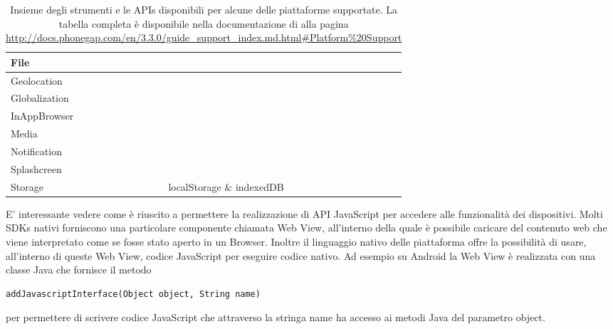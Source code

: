 {\begin{table}
\begin{tabularx}{\textwidth}{|l*{7}{|s}|}
                        \tabularnewline
                        \hline
                        File & \sprt{} & \sprt{} & \sprt{} & \sprt{} & \notsprt{}
                        \tabularnewline
                        \hline
                        Geolocation & \sprt{} & \sprt{} & \sprt{} & \sprt{} & \sprt{}
                        \tabularnewline
                        \hline
                        Globalization & \sprt{} & \notsprt{} & \sprt{} & \sprt{} &
                        \notsprt{}
                        \tabularnewline
                        \hline
                        InAppBrowser & \sprt{} & \sprt{} & \sprt{} & \sprt{} & \notsprt{}
                        \tabularnewline
                        \hline
                        Media & \sprt{} & \sprt{} & \sprt{} & \sprt{} & \sprt{}
                        \tabularnewline
                        \hline
                        Notification & \sprt{} & \sprt{} & \sprt{} & \sprt{} & \sprt{}
                        \tabularnewline
                        \hline
                        Splashcreen & \sprt{} & \sprt{} & \sprt{} & \sprt{} & \notsprt{}
                        \tabularnewline
                        \hline
                        Storage & \sprt{} & \sprt{} & \sprt{} & \sprt{} localStorage
                        \& indexedDB & \notsprt{}
                        \tabularnewline
                        \hline
                    \end{tabularx}
                    \caption{Insieme degli strumenti e le
                    APIs disponibili per alcune delle piattaforme supportate.
                    La tabella completa è disponibile nella documentazione
                    di \pg{} alla pagina \url{http://docs.phonegap.com/en/3.3.0/guide_support_index.md.html\#Platform\%20Support}}
                    \label{fig:platformsupport}
                \end{table}
            }

            E' interessante vedere come \pg{} è riuscito a permettere la
            realizzazione di API JavaScript per accedere alle funzionalità
            dei dispositivi.
            Molti SDKs nativi forniscono una particolare componente chiamata
            Web View, all'interno della quale è possibile caricare del contenuto
            web che viene interpretato come se fosse stato aperto in
            un Browser.
            Inoltre il linguaggio nativo delle piattaforma offre la possibilità
            di usare, all'interno di queste Web View, codice JavaScript per
            eseguire codice nativo.
            Ad esempio su Android la Web View è realizzata con una classe Java
            che fornisce il metodo
    \begin{lstlisting}[language=MyJava]
  addJavascriptInterface(Object object, String name)
    \end{lstlisting}
            per permettere
            di scrivere codice JavaScript che attraverso la stringa name ha accesso
            ai metodi Java del parametro object.

